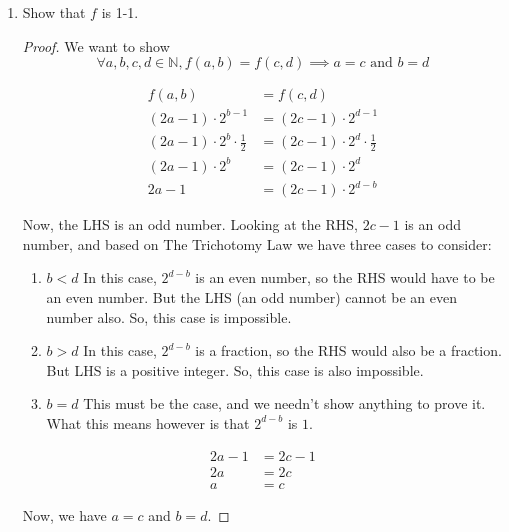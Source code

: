 \documentclass[12pt,letterpaper]{article}
\begin{document}
\begin{enumerate}
      \begin{enumerate}
        \item Show that $f$ is 1-1.

          \begin{proof}
            We want to show
            \[\forall a, b, c, d \in \mathbb{N}, f(a,b) = f(c,d) \implies a = c \text{ and } b = d\]

            \begin{align*}
              f(a,b) &= f(c,d) \\
              (2a - 1) \cdot 2^{b - 1} &= (2c - 1) \cdot 2^{d - 1} \\
              (2a - 1) \cdot 2^b \cdot \frac{1}{2} &= (2c - 1) \cdot 2^d \cdot \frac{1}{2} \\
              (2a - 1) \cdot 2^b &= (2c - 1) \cdot 2^d \\
              2a - 1 &= (2c - 1) \cdot 2^{d-b}
            \end{align*}

            Now, the LHS is an odd number.
            Looking at the RHS, $2c - 1$ is an odd number,
            and based on The Trichotomy Law we have three cases to consider:

            \begin{enumerate}
              \item $b < d$
                In this case, $2^{d-b}$ is an even number,
                so the RHS would have to be an even number.
                But the LHS (an odd number) cannot be an even number also.
                So, this case is impossible.
              \item $b > d$
                In this case, $2^{d-b}$ is a fraction,
                so the RHS would also be a fraction.
                But LHS is a positive integer.
                So, this case is also impossible.
              \item $b = d$
                This must be the case, and we needn't show anything to prove it.
                What this means however is that $2^{d-b}$ is $1$.
            \end{enumerate}

            \begin{align*}
              2a - 1 &= 2c - 1 \\
              2a &= 2c \\
              a &= c
            \end{align*}

            Now, we have $a = c$ and $b = d$.


\end{proof}
\end{enumerate}
\end{enumerate}
\end{document}
